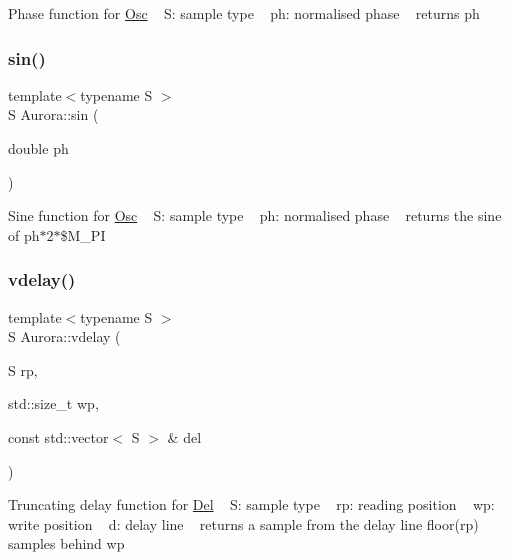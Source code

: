 Phase function for \hyperlink{class_aurora_1_1_osc}{Osc} ~\newline
S\+: sample type ~\newline
ph\+: normalised phase ~\newline
returns ph \mbox{\label{namespace_aurora_a388ea5736944d8887f5586afd45a03b8}} 
\subsubsection{\texorpdfstring{sin()}{sin()}}
{\footnotesize\ttfamily template$<$typename S $>$ \\
S Aurora\+::sin (\begin{DoxyParamCaption}\item[{double}]{ph }\end{DoxyParamCaption})}

Sine function for \hyperlink{class_aurora_1_1_osc}{Osc} ~\newline
S\+: sample type ~\newline
ph\+: normalised phase ~\newline
returns the sine of ph$\ast$2$\ast$\$\+M\+\_\+\+PI \mbox{\label{namespace_aurora_ab93392950e0b9ae8fbbccf7cc1b55a13}} 
\subsubsection{\texorpdfstring{vdelay()}{vdelay()}}
{\footnotesize\ttfamily template$<$typename S $>$ \\
S Aurora\+::vdelay (\begin{DoxyParamCaption}\item[{S}]{rp,  }\item[{std\+::size\+\_\+t}]{wp,  }\item[{const std\+::vector$<$ S $>$ \&}]{del }\end{DoxyParamCaption})}

Truncating delay function for \hyperlink{class_aurora_1_1_del}{Del} ~\newline
S\+: sample type ~\newline
rp\+: reading position ~\newline
wp\+: write position ~\newline
d\+: delay line ~\newline
returns a sample from the delay line floor(rp) samples behind wp \mbox{\label{namespace_aurora_a5318ddb492590ada5dc40ba80bbf655b}} 
